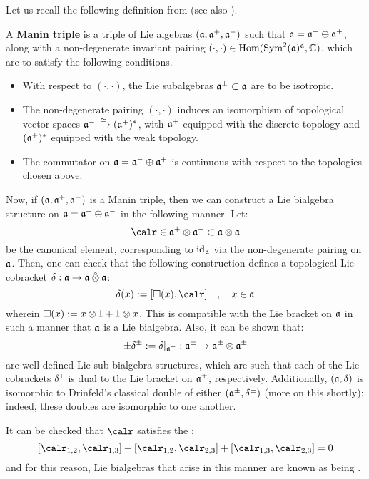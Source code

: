 Let us recall the following definition from \cite[Subsection 2.6]{appel_laredo_2_categorical_etingof_kazhdan_quantisation} (see also \cite[Subsection 7.4]{etingof_kazhdan_quantisation_1}).
\begin{definition} \label{def: manin_triples}
    A \textbf{Manin triple} is a triple of Lie algebras $(\mathfrak{a}, \mathfrak{a}^+, \mathfrak{a}^-)$ such that $\mathfrak{a} = \mathfrak{a}^- \oplus \mathfrak{a}^+$, along with a non-degenerate invariant pairing $(\cdot, \cdot) \in \operatorname{Hom}( \operatorname{Sym}^2(\mathfrak{a})^{\mathfrak{a}}, \mathbb{C} )$, which are to satisfy the following conditions.
    \begin{itemize}
        \item With respect to $(\cdot, \cdot)$, the Lie subalgebras $\mathfrak{a}^{\pm} \subset \mathfrak{a}$ are to be isotropic. 
        \item The non-degenerate pairing $(\cdot, \cdot)$ induces an isomorphism of topological vector spaces $\mathfrak{a}^- \xrightarrow[]{\simeq} (\mathfrak{a}^+)^*$, with $\mathfrak{a}^+$ equipped with the discrete topology and $(\mathfrak{a}^+)^*$ equipped with the weak topology.
        \item The commutator on $\mathfrak{a} = \mathfrak{a}^- \oplus \mathfrak{a}^+$ is continuous with respect to the topologies chosen above. 
    \end{itemize}
\end{definition}
Now, if $(\mathfrak{a}, \mathfrak{a}^+, \mathfrak{a}^-)$ is a Manin triple, then we can construct a Lie bialgebra structure on $\mathfrak{a} = \mathfrak{a}^+ \oplus \mathfrak{a}^-$ in the following manner. Let:
    $$\calr \in \a^+ \tensor \a^- \subset \a \tensor \a$$
be the canonical element, corresponding to $\mathrm{id}_{\mathfrak{a}}$ via the non-degenerate pairing on $\mathfrak{a}$. Then, one can check that the following construction defines a topological Lie cobracket $\delta: \a \to \a \hattensor \a$:
    \begin{equation}
        \delta(x) := [\Box(x), \calr] \quad, \quad x \in \a
    \end{equation}
wherein $\Box(x) := x \tensor 1 + 1 \tensor x$. This is compatible with the Lie bracket on $\mathfrak{a}$ in such a manner that $\mathfrak{a}$ is a Lie bialgebra. Also, it can be shown that:
    $$\pm \delta^{\pm} := \delta|_{\a^{\pm}}: \a^{\pm} \to \a^{\pm} \tensor \a^{\pm}$$
are well-defined Lie sub-bialgebra structures, which are such that each of the Lie cobrackets $\delta^{\pm}$ is dual to the Lie bracket on $\mathfrak{a}^{\pm}$, respectively. Additionally, $(\mathfrak{a}, \delta)$ is isomorphic to Drinfeld's classical double of either $(\mathfrak{a}^{\pm}, \delta^{\pm})$ (more on this shortly); indeed, these doubles are isomorphic to one another.
\begin{remark}
    It can be checked that $\calr$ satisfies the :
        \begin{equation} \label{equation: CYBE}
            [\calr_{1, 2}, \calr_{1, 3}] + [\calr_{1, 2}, \calr_{2, 3}] + [\calr_{1, 3}, \calr_{2, 3}] = 0
        \end{equation}
    and for this reason, Lie bialgebras that arise in this manner are known as being .
\end{remark}

